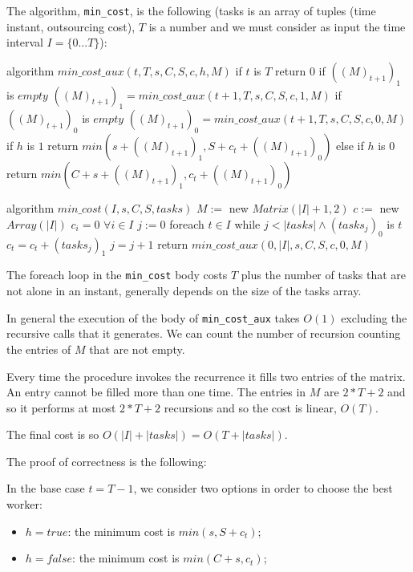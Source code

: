 \documentclass[paper=a4, fontsize=11pt]{scrartcl} %
\numberwithin{equation}{section} %
\numberwithin{figure}{section} %
\numberwithin{table}{section} %
\begin{document}
The algorithm, \verb|min_cost|, is the following (tasks is an array of tuples (time instant, outsourcing cost), $T$ is a number and we must consider as input the time interval $I = \{0 ... T\}$):

\begin{pseudo}
algorithm $min\_cost\_aux(t, T, s, C, S, c, h, M)$
    if $t$ is $T$
        return $0$
    if $((M)_{t+1})_1$ is $empty$
         $((M)_{t+1})_1 = min\_cost\_aux(t+1, T, s, C, S, c, 1, M)$
    if $((M)_{t+1})_0$ is $empty$
         $((M)_{t+1})_0 = min\_cost\_aux(t+1, T, s, C, S, c, 0, M)$
    if $h$ is $1$
        return $min(s + ((M)_{t+1})_1, S + c_t + ((M)_{t+1})_0)$
    else if $h$ is $0$
        return $min(C + s + ((M)_{t+1})_1, c_t + ((M)_{t+1})_0)$
\end{pseudo}
\begin{pseudo}
algorithm $min\_cost(I, s, C, S, tasks)$
    $M :=$ new $Matrix(|I|+1, 2)$
    $c :=$ new $Array(|I|)$
    $c_i = 0$ $\forall i \in I$
    $j := 0$
    foreach $t \in I$
        while $j < |tasks| \land (tasks_j)_0$ is $t$
            $c_t = c_t + (tasks_j)_1$
            $j = j +1$
    return $min\_cost\_aux(0, |I|, s, C, S, c, 0, M)$
\end{pseudo}

The foreach loop in the \verb|min_cost| body costs $T$ plus the number of tasks that are not alone in an instant, generally depends on the size of the tasks array.

In general the execution of the body of \verb|min_cost_aux| takes $O(1)$ excluding the recursive calls that it generates. We can count the number of recursion counting the entries of $M$ that are not empty.

Every time the procedure invokes the recurrence it fills two entries of the matrix. An entry cannot be filled more than one time. The entries in $M$ are $2*T+2$ and so it performs at most $2*T+2$ recursions and so the cost is linear, $O(T)$.

The final cost is so $O(|I| + |tasks|) = O(T + |tasks|)$.

The proof of correctness is the following:

In the base case $t = T-1$, we consider two options in order to choose the best worker:
\begin{itemize}
    \item $h = true$: the minimum cost is $min(s, S + c_t)$;
    \item $h = false$: the minimum cost is $min(C + s, c_t)$;
\end{itemize}
\end{document}
